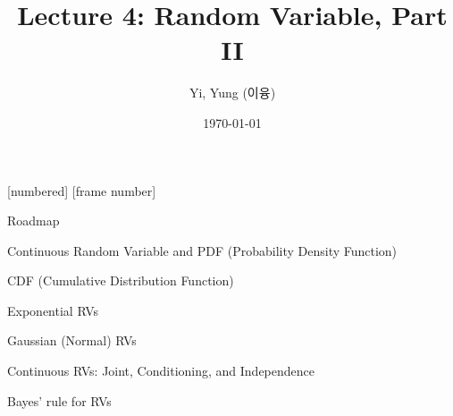 

\csname\pdfmode\endcsname

{
  [numbered]
  [frame number]  %
}



\title[]{Lecture 4: Random Variable, Part II}
\author{Yi, Yung (이융)}
\date{\today}








\begin{frame}
  \titlepage
\end{frame}




\begin{frame}{Roadmap}


\plitemsep 0.1in
\bce[(1)]
\item Continuous Random Variable and PDF (Probability Density Function)

\item CDF (Cumulative Distribution Function)

\item Exponential RVs

\item Gaussian (Normal) RVs

\item Continuous RVs: Joint, Conditioning, and Independence

\item Bayes' rule for RVs

\ece
\end{frame}


